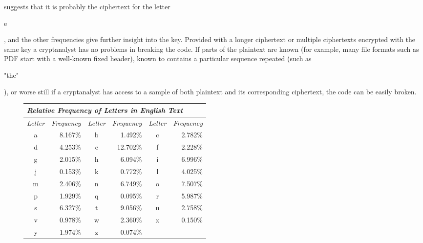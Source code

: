 suggests that it is probably the ciphertext for the letter
\begin{code}e\end{code}, and the other frequencies give further
insight into the key. Provided with a longer ciphertext or
multiple ciphertexts encrypted with the same key a cryptanalyst
has no problems in breaking the code.
If parts of the plaintext are known (for example, many file
formats such as PDF start with a well-known fixed header),
known to contains a particular sequence repeated (such as
\begin{code}"the"\end{code}), or worse still if a cryptanalyst has
access to a sample of both plaintext and its corresponding
ciphertext, the code can be easily broken.
\begin{figure*}[htb]\begin{center}
\begin{tabular}{|c|r|c|r|c|r|} \hline
  \multicolumn{6}{|l|}{\textit{Relative Frequency of Letters in English Text}} \\ \hline\hline
  \textit{Letter} & \textit{Frequency} & \textit{Letter} & \textit{Frequency}
  & \textit{Letter} & \textit{Frequency} \\ \hline
  a & 8.167\% &
  b & 1.492\% &
  c & 2.782\% \\
  d & 4.253\% &
  e & 12.702\% &
  f & 2.228\% \\
  g & 2.015\% &
  h & 6.094\% &
  i & 6.996\% \\
  j & 0.153\% &
  k & 0.772\% &
  l & 4.025\% \\
  m & 2.406\% &
  n & 6.749\% &
  o & 7.507\% \\
  p & 1.929\% &
  q & 0.095\% &
  r & 5.987\% \\
  s & 6.327\% &
  t & 9.056\% &
  u & 2.758\% \\
  v & 0.978\% &
  w & 2.360\% &
  x & 0.150\% \\
  y & 1.974\% &
  z & 0.074\% & & \\ \hline
\end{tabular}\end{center}
\end{figure*}

